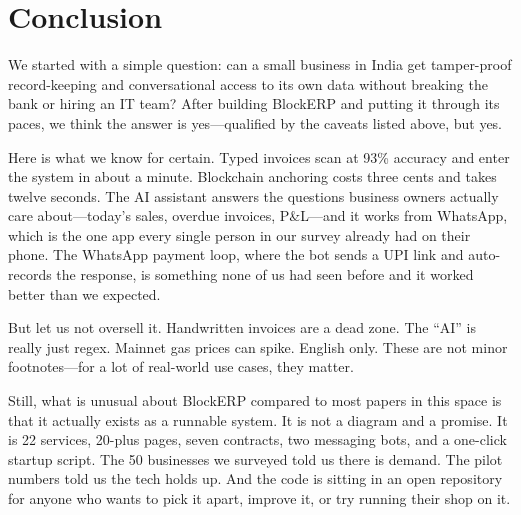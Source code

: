 \documentclass[conference]{IEEEtran}
\begin{document}
\section{Conclusion}

We started with a simple question: can a small business in India get tamper-proof record-keeping and conversational access to its own data without breaking the bank or hiring an IT team? After building BlockERP and putting it through its paces, we think the answer is yes---qualified by the caveats listed above, but yes.

Here is what we know for certain. Typed invoices scan at 93\% accuracy and enter the system in about a minute. Blockchain anchoring costs three cents and takes twelve seconds. The AI assistant answers the questions business owners actually care about---today's sales, overdue invoices, P\&L---and it works from WhatsApp, which is the one app every single person in our survey already had on their phone. The WhatsApp payment loop, where the bot sends a UPI link and auto-records the response, is something none of us had seen before and it worked better than we expected.

But let us not oversell it. Handwritten invoices are a dead zone. The ``AI'' is really just regex. Mainnet gas prices can spike. English only. These are not minor footnotes---for a lot of real-world use cases, they matter.

Still, what is unusual about BlockERP compared to most papers in this space is that it actually exists as a runnable system. It is not a diagram and a promise. It is 22 services, 20-plus pages, seven contracts, two messaging bots, and a one-click startup script. The 50 businesses we surveyed told us there is demand. The pilot numbers told us the tech holds up. And the code is sitting in an open repository for anyone who wants to pick it apart, improve it, or try running their shop on it.
\end{document}
